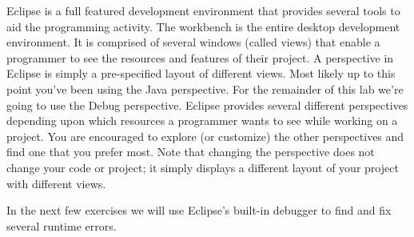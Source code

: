 \documentclass[12pt]{scrartcl}
\begin{document}
Eclipse is a full featured development environment that provides several tools 
to aid the programming activity.  The workbench is the entire desktop 
development environment.  It is comprised of several windows (called views) 
that enable a programmer to see the resources and features of their project.  
A perspective in Eclipse is simply a pre-specified layout of different views.  
Most likely up to this point you've been using the Java perspective.  For the 
remainder of this lab we're going to use the Debug perspective.  Eclipse provides 
several different perspectives depending upon which resources a programmer 
wants to see while working on a project.  You are encouraged to explore (or 
customize) the other perspectives and find one that you prefer most.  Note 
that changing the perspective does not change your code or project; it simply 
displays a different layout of your project with different views.

In the next few exercises we will use Eclipse's built-in debugger to find and fix 
several runtime errors.
\end{document}
